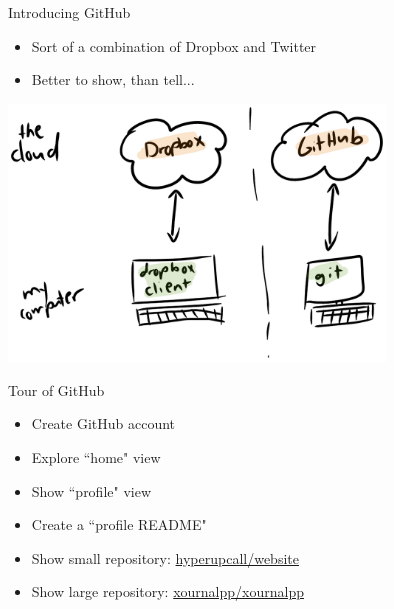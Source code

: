 \documentclass{beamer}
\begin{document}
\begin{frame}{Introducing GitHub}
	\begin{itemize}
		\item Sort of a combination of Dropbox and Twitter
		\item Better to show, than tell...
	\end{itemize}

	\includegraphics[width=10cm]{dropbox-github.png} \newline

\end{frame}

\begin{frame}{Tour of GitHub}
	\begin{itemize}
		\item Create GitHub account
		\item Explore ``home" view
		\item Show ``profile" view
		\item Create a ``profile README"
		\item Show small repository: \href{https://github.com/hyperupcall/website}{hyperupcall/website}
		\item Show large repository: \href{https://github.com/xournalpp/xournalpp}{xournalpp/xournalpp}
	\end{itemize}

\end{frame}
\end{document}
